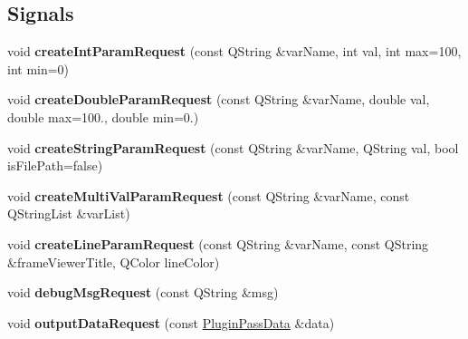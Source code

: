 \subsection*{Signals}
\begin{DoxyCompactItemize}
\item 
\hypertarget{class_nooba_plugin_a_p_i_a7ca475f8be6c10a6f0f3bc9b5f8076be}{void {\bfseries create\-Int\-Param\-Request} (const Q\-String \&var\-Name, int val, int max=100, int min=0)}\label{class_nooba_plugin_a_p_i_a7ca475f8be6c10a6f0f3bc9b5f8076be}

\item 
\hypertarget{class_nooba_plugin_a_p_i_a2c798592fda37a108b9b141688904502}{void {\bfseries create\-Double\-Param\-Request} (const Q\-String \&var\-Name, double val, double max=100., double min=0.)}\label{class_nooba_plugin_a_p_i_a2c798592fda37a108b9b141688904502}

\item 
\hypertarget{class_nooba_plugin_a_p_i_aace29b22ace007cd11d920a1f4ca7c86}{void {\bfseries create\-String\-Param\-Request} (const Q\-String \&var\-Name, Q\-String val, bool is\-File\-Path=false)}\label{class_nooba_plugin_a_p_i_aace29b22ace007cd11d920a1f4ca7c86}

\item 
\hypertarget{class_nooba_plugin_a_p_i_a7a30dd6d87281b1bdaa8e63c3277c09f}{void {\bfseries create\-Multi\-Val\-Param\-Request} (const Q\-String \&var\-Name, const Q\-String\-List \&var\-List)}\label{class_nooba_plugin_a_p_i_a7a30dd6d87281b1bdaa8e63c3277c09f}

\item 
\hypertarget{class_nooba_plugin_a_p_i_a8e491471624e53dc54b36fe16a38749a}{void {\bfseries create\-Line\-Param\-Request} (const Q\-String \&var\-Name, const Q\-String \&frame\-Viewer\-Title, Q\-Color line\-Color)}\label{class_nooba_plugin_a_p_i_a8e491471624e53dc54b36fe16a38749a}

\item 
\hypertarget{class_nooba_plugin_a_p_i_a70ebb0070b79b33737532162b682a8a5}{void {\bfseries debug\-Msg\-Request} (const Q\-String \&msg)}\label{class_nooba_plugin_a_p_i_a70ebb0070b79b33737532162b682a8a5}

\item 
\hypertarget{class_nooba_plugin_a_p_i_a707c8e8219f628535fb5155a7782df1d}{void {\bfseries output\-Data\-Request} (const \hyperlink{class_plugin_pass_data}{Plugin\-Pass\-Data} \&data)}\label{class_nooba_plugin_a_p_i_a707c8e8219f628535fb5155a7782df1d}


\end{DoxyCompactItemize}
